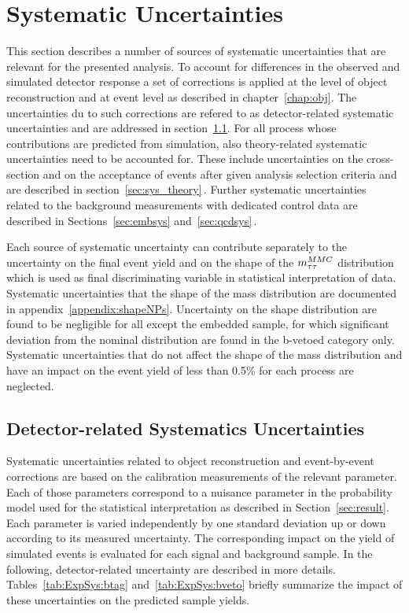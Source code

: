 \section{Systematic Uncertainties}
\label{sec:Systematics}

This section describes a number of sources of systematic uncertainties
that are relevant for the presented  analysis. To account for differences in the observed and simulated 
detector response a set of corrections is applied at the level of object reconstruction  
and at event level as described in chapter~\ref{chap:obj}. 
The uncertainties du to such corrections are refered to as detector-related systematic 
uncertainties and are addressed in section~\ref{sec:sys:sys_det}. 
For all process whose contributions are predicted from simulation, also theory-related
systematic uncertainties need to be accounted for. These include uncertainties on the cross-section and
 on the acceptance of events after given analysis selection criteria and 
are  described in section~\ref{sec:sys_theory}$\,.$
Further systematic uncertainties related to the background measurements with dedicated control data 
are described in Sections~\ref{sec:embsys} and~\ref{sec:qcdsys}$\,.$

Each source of systematic uncertainty can contribute separately to the uncertainty on the
final event yield and on the shape of the $m_{\tau\tau}^{MMC}$
distribution which is used as final discriminating variable in statistical interpretation of data. Systematic uncertainties
that the shape of the mass distribution are
documented in appendix~\ref{appendix:shapeNPs}. Uncertainty on the \mmc shape distribution 
are found to be negligible for all except the embedded sample, for which significant 
deviation from the nominal distribution are found in the b-vetoed category only. 
Systematic uncertainties that do not affect the
shape of the mass distribution and have an impact on the event yield of less than 0.5\% for each process are 
neglected.


\subsection{Detector-related Systematics Uncertainties}
\label{sec:sys:sys_det}
Systematic uncertainties related to object reconstruction and event-by-event 
corrections are based on the calibration measurements of the relevant parameter. Each 
of those parameters correspond to a nuisance parameter in the probability model used for the  statistical interpretation
as described in Section~\ref{sec:result}.
Each parameter is varied independently by one standard deviation up or down according to its measured
uncertainty. The corresponding impact on the  yield of simulated events is evaluated for each signal and background sample.
In the following, detector-related uncertainty are  described in more details.
Tables~\ref{tab:ExpSys:btag} and~\ref{tab:ExpSys:bveto} briefly summarize the impact of these uncertainties on the 
predicted sample yields. 



